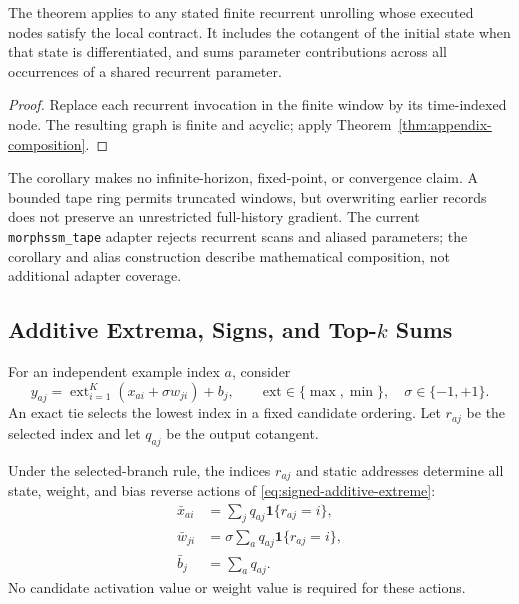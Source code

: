 \begin{corollary}
\label{cor:finite-window}
The theorem applies to any stated finite recurrent unrolling whose executed
nodes satisfy the local contract. It includes the cotangent of the initial
state when that state is differentiated, and sums parameter contributions
across all occurrences of a shared recurrent parameter.
\end{corollary}

\begin{proof}
Replace each recurrent invocation in the finite window by its time-indexed
node. The resulting graph is finite and acyclic; apply
Theorem~\ref{thm:appendix-composition}.
\end{proof}

The corollary makes no infinite-horizon, fixed-point, or convergence claim.
A bounded tape ring permits truncated windows, but overwriting earlier records
does not preserve an unrestricted full-history gradient. The current
\texttt{morphssm\_tape} adapter rejects recurrent scans and aliased parameters;
the corollary and alias construction describe mathematical composition, not
additional adapter coverage.

\subsection{Additive Extrema, Signs, and Top-\texorpdfstring{$k$}{k} Sums}
\label{app:operators}

For an independent example index $a$, consider
\begin{equation}
 y_{aj}=\mathop{\mathrm{ext}}_{i=1}^{K}
          (x_{ai}+\sigma w_{ji})+b_j,
 \qquad \mathrm{ext}\in\{\max,\min\},\quad \sigma\in\{-1,+1\}.
 \label{eq:signed-additive-extreme}
\end{equation}
An exact tie selects the lowest index in a fixed candidate ordering. Let
$r_{aj}$ be the selected index and let $q_{aj}$ be the output cotangent.

\begin{proposition}
\label{prop:additive-route}
Under the selected-branch rule, the indices $r_{aj}$ and static addresses
determine all state, weight, and bias reverse actions of
\eqref{eq:signed-additive-extreme}:
\begin{align}
 \bar x_{ai}&=\sum_j q_{aj}\mathbf{1}\{r_{aj}=i\},\\
 \bar w_{ji}&=\sigma\sum_a q_{aj}\mathbf{1}\{r_{aj}=i\},\\
 \bar b_j&=\sum_a q_{aj}.
 \label{eq:additive-reverse}
\end{align}
No candidate activation value or weight value is required for these actions.
\end{proposition}

